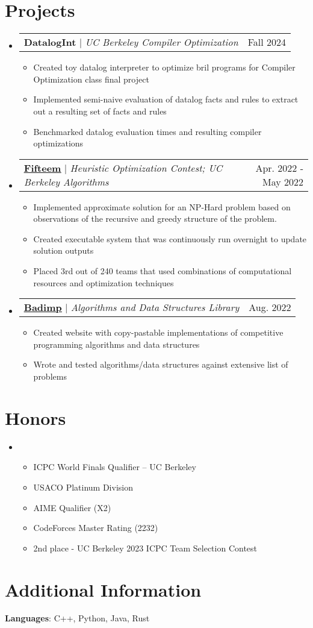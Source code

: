 \documentclass[letterpaper,11pt]{article}
\makeatletter
\newcommand{\resumeItem}[1]{
  \item\small{
    {#1 \vspace{-2pt}}
  }
}
\newcommand{\resumeProjectHeading}[2]{
    \item
    \begin{tabular*}{0.97\textwidth}{l@{\extracolsep{\fill}}r}
      \small#1 & #2 \\
    \end{tabular*}\vspace{-7pt}
}
\newcommand{\resumeSubHeadingListStart}{\begin{itemize}[leftmargin=0.15in, label={}]}
\newcommand{\resumeSubHeadingListEnd}{\end{itemize}}
\newcommand{\resumeItemListStart}{\begin{itemize}}
\newcommand{\resumeItemListEnd}{\end{itemize}\vspace{-5pt}}
\makeatother
\begin{document}
\section{Projects}
\resumeSubHeadingListStart
\resumeProjectHeading
{\textbf{DatalogInt} $|$ \emph{UC Berkeley Compiler Optimization}}{Fall 2024}
\resumeItemListStart
\resumeItem{Created toy datalog interpreter to optimize bril programs for Compiler Optimization class final project}
\resumeItem{Implemented semi-naive evaluation of datalog facts and rules to extract out a resulting set of facts and rules}
\resumeItem{Benchmarked datalog evaluation times and resulting compiler optimizations}
\resumeItemListEnd
\resumeProjectHeading
{\href{https://github.com/ernest-lu/Fifteem/blob/main/projectreflection.pdf}{\underline{\textbf{Fifteem}}} $|$ \emph{Heuristic Optimization Contest; UC Berkeley Algorithms}}{Apr. 2022 - May 2022}
\resumeItemListStart
\resumeItem{Implemented approximate solution for an NP-Hard problem based on observations of the recursive and greedy structure of the problem.}
\resumeItem{Created executable system that was continuously run overnight to update solution outputs}
\resumeItem{Placed 3rd out of 240 teams that used combinations of computational resources and optimization techniques}
\resumeItemListEnd
\resumeProjectHeading
{\href{https://badimp.vercel.app/}{\underline{\textbf{Badimp}}} $|$ \emph{Algorithms and Data Structures Library}}{Aug. 2022}
\resumeItemListStart
\resumeItem{Created website with copy-pastable implementations of competitive programming algorithms and data structures}
\resumeItem{Wrote and tested algorithms/data structures against extensive list of problems}
\resumeItemListEnd
\resumeSubHeadingListEnd

\section{Honors}
\resumeSubHeadingListStart
\item{}
\resumeItemListStart
\resumeItem{ICPC World Finals Qualifier – UC Berkeley}
\resumeItem{USACO Platinum Division}
\resumeItem{AIME Qualifier (X2)}
\resumeItem{CodeForces Master Rating (2232)}
\resumeItem{2nd place - UC Berkeley 2023 ICPC Team Selection Contest}
\resumeItemListEnd
\resumeSubHeadingListEnd


%
\section{Additional Information}
\begin{itemize}[leftmargin=0.15in, label={}]
  \small{\item{
                \textbf{Languages}{: C++, Python, Java, Rust} \\
          }}
\end{itemize}


\end{document}
